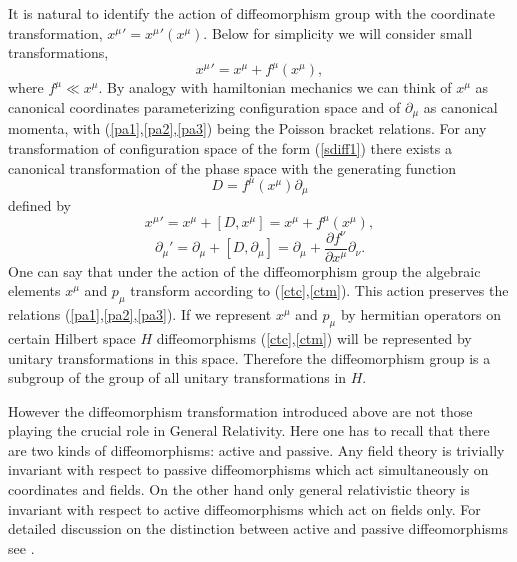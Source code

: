 \documentclass[a4paper,11pt]{article}
\begin{document}
It is natural to identify the action of diffeomorphism group with
the coordinate transformation, ${x^\mu}'={x^\mu}'(x^\mu)$. Below
for simplicity we will consider small transformations,
\begin{equation}
{x^\mu}'=x^\mu+f^\mu(x^\mu), \label{sdiff1}
\end{equation}
where $f^\mu \ll x^\mu$. By analogy with hamiltonian mechanics we
can think of $x^\mu$ as canonical coordinates parameterizing
configuration space and of $\partial_\mu$ as canonical momenta,
with (\ref{pa1},\ref{pa2},\ref{pa3}) being the Poisson bracket
relations. For any transformation of configuration space  of the
form (\ref{sdiff1}) there exists a canonical transformation of the
phase space with the generating function
\begin{equation}
D=f^\mu(x^\mu)\partial_\mu \label{diffgen}
\end{equation}
 defined by
\begin{equation}
{x^\mu}'=x^\mu+[D,x^\mu]=x^\mu+f^\mu(x^\mu), \label{ctc}
\end{equation}
\begin{equation}
\partial_\mu'=\partial_\mu+[D,\partial_\mu]=\partial_\mu+\frac{\partial f^{\nu}}{\partial
x^{\mu}}\partial_\nu. \label{ctm}
\end{equation}
One can say that under the action of the diffeomorphism group the
algebraic elements $x^\mu$ and $p_\mu$ transform according to
(\ref{ctc},\ref{ctm}). This action preserves the relations
(\ref{pa1},\ref{pa2},\ref{pa3}). If we represent $x^\mu$ and
$p_\mu$ by hermitian operators on certain Hilbert space $H$
diffeomorphisms (\ref{ctc},\ref{ctm}) will be represented by
unitary transformations in this space. Therefore the
diffeomorphism group is a subgroup of the group of all unitary
transformations in $H$.

However the diffeomorphism transformation introduced above are not
those playing the crucial role in General Relativity. Here one has
to recall that there are two kinds of diffeomorphisms: active and
passive. Any field theory is trivially invariant with respect to
passive diffeomorphisms which act simultaneously on coordinates
and fields. On the other hand only general relativistic theory is
invariant with respect to active diffeomorphisms which act on
fields only. For detailed discussion on the distinction between
active and passive diffeomorphisms see \cite{RovelliGaul}.
\end{document}
